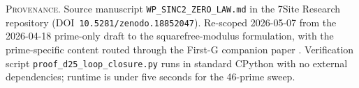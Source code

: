 \documentclass[11pt,reqno]{amsart}
\theoremstyle{plain}
\theoremstyle{remark}
\begin{document}
\vfill
\noindent
\footnotesize{%
\textsc{Provenance.}\; Source manuscript
\texttt{WP\_SINC2\_ZERO\_LAW.md} in the 7Site Research repository
(DOI~\texttt{10.5281/zenodo.18852047}). Re-scoped 2026-05-07 from
the 2026-04-18 prime-only draft to the squarefree-modulus
formulation, with the prime-specific content routed through the
First-G companion paper \cite{J04}. Verification script
\texttt{proof\_d25\_loop\_closure.py} runs in standard CPython with
no external dependencies; runtime is under five seconds for the
46-prime sweep.}
\end{document}
